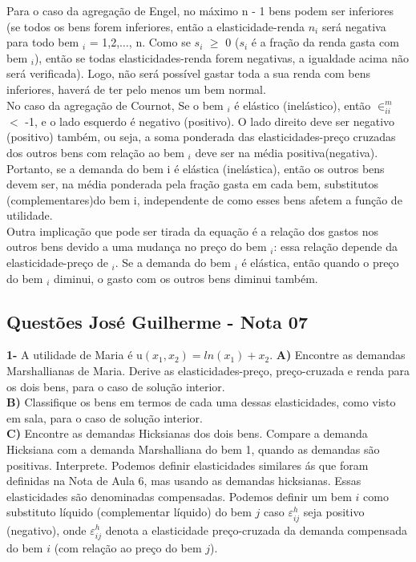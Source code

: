 \begin{flushleft}
Para o caso da agregação de Engel, no máximo n - 1 bens podem ser inferiores (se todos os bens forem inferiores, então a elasticidade-renda $n_{i}$ será negativa para todo bem $_{i}$ = 1,2,$\ldots$, n. Como se $s_{i}$ $\geq$ 0 ($s_{i}$ é a fração da renda gasta com bem $_{i}$), então se todas elasticidades-renda forem negativas, a igualdade acima não será verificada). Logo, não será possível gastar toda a sua renda com bens inferiores, haverá de ter pelo menos um bem normal.
\\
No caso da agregação de Cournot, Se o bem $_{i}$ é elástico (inelástico), então $\in_{ii}^{m}$ $<$ -1, e o lado esquerdo é negativo (positivo). O lado direito deve ser negativo (positivo) também, ou seja, a soma ponderada das
elasticidades-preço cruzadas dos outros bens com relação ao bem $_{i}$ deve ser na média positiva(negativa). Portanto, se a demanda do bem i é elástica (inelástica), então os outros bens devem ser, na média ponderada pela fração gasta em cada bem, substitutos (complementares)do bem i, independente de como esses bens afetem a função de utilidade.
\\
Outra implicação que pode ser tirada da equação é a relação dos gastos nos outros bens devido a uma mudança no preço do bem $_{i}$: essa relação depende da elasticidade-preço de $_{i}$. Se a demanda do bem $_{i}$ é elástica, então quando o preço do bem $_{i}$ diminui, o gasto com os outros bens diminui também. 
\singlespacing

\begin{center}
\item	\section*{Questões José Guilherme - Nota 07}
\end{center}

\singlespacing
\textbf{1- } A utilidade de Maria é u$(x_{1},x_{2}) = ln(x_{1}) + x_{2}$.
\singlespacing
\textbf{A)} Encontre as demandas Marshallianas de Maria. Derive as elasticidades-preço, preço-cruzada e renda para os dois bens, para o caso de solução interior.
\\
\textbf{B)} Classifique os bens em termos de cada uma dessas elasticidades, como visto em sala, para o caso de solução interior.
\\
\textbf{C)} Encontre as demandas Hicksianas dos dois bens. Compare a demanda Hicksiana com a demanda Marshalliana do bem 1, quando as demandas são positivas. Interprete.
\singlespacing
Podemos definir elasticidades similares ás que foram definidas na Nota de Aula 6, mas usando as demandas hicksianas. Essas elasticidades são denominadas compensadas. Podemos definir um bem $\textit{i}$ como substituto líquido (complementar líquido) do bem $\textit{j}$ caso $\varepsilon _{ij}^{h}$ seja positivo
(negativo), onde  $\varepsilon _{ij}^{h}$ denota a elasticidade preço-cruzada da demanda compensada do bem $\textit{i}$ (com relação ao preço do bem $\textit{j}$).
\singlespacing


\end{flushleft}
